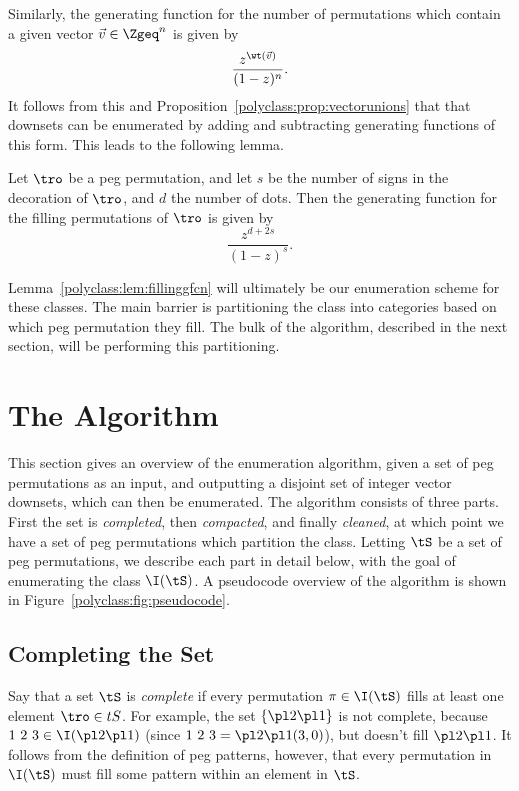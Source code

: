 \documentclass[12pt,twoside]{memoir}
\begin{document}
      Similarly, the generating function for the number of permutations which
      contain a given vector $\vec v \in \Zgeq^n$ is given by 
      $$ \frac{z^{\wt(\vec v)}}{(1 - z)^n} .$$
      It follows from this and Proposition~\ref{polyclass:prop:vectorunions} that
      that downsets can be enumerated by adding and subtracting generating
      functions of this form. This leads to the following lemma. 

      \begin{lemma} \label{polyclass:lem:fillinggfcn}
        Let $\tro$ be a peg permutation, and let $s$ be the number of signs in
        the decoration of $\tro$, and $d$ the number of dots. Then the generating
        function for the filling permutations of $\tro$ is given by 
        $$ \frac{z^{d + 2s}}{(1 - z)^s}.$$ 
      \end{lemma}
      
      Lemma~\ref{polyclass:lem:fillinggfcn} will ultimately be our enumeration
      scheme for these classes. The main barrier is partitioning the class
      into categories based on which peg permutation they fill. The bulk of the
      algorithm, described in the next section, will be performing this
      partitioning. 
          

  \section{The Algorithm}
  \label{polyclass:sec:algo}

    This section gives an overview of the enumeration algorithm, given a set of
    peg permutations as an input, and outputting a disjoint set of integer vector
    downsets, which can then be enumerated. The algorithm consists of three
    parts. First the set is \emph{completed}, then \emph{compacted}, and finally
    \emph{cleaned}, at which point we have a set of peg permutations which
    partition the class. Letting $\tS$ be a set of peg permutations, we describe
    each part in detail below, with the goal of enumerating the class $\I(\tS)$.
    A pseudocode overview of the algorithm is shown in
    Figure~\ref{polyclass:fig:pseudocode}.

    \subsection{Completing the Set}
      Say that a set $\tS$ is \emph{complete} if every permutation $\pi \in
      \I(\tS)$ fills at least one element $\tro \in tS$. For example, the set
      $\{\pl 2 \pl 1\}$ is not complete, because $1\ 2\ 3 \in \I(\pl 2 \pl 1)$
      (since $1\ 2\ 3 = \pl 2 \pl1 (3,0)$), but doesn't fill $\pl 2 \pl 1$. It
      follows from the definition of peg patterns, however, that every
      permutation in $\I(\tS)$ must fill some pattern within an element in $\tS$. 
\end{document}
